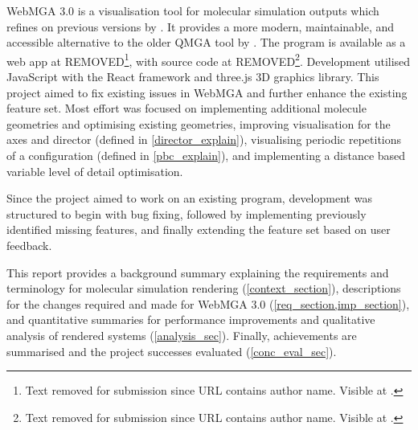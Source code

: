 WebMGA 3.0 is a visualisation tool for molecular simulation outputs which refines on previous versions by \textcite{Battistini_2021,webmga_2}. It provides a more modern, maintainable, and accessible alternative to the older QMGA tool by \textcite{gabriel2008molecular}. The program is available as a web app at REMOVED\footnote{Text removed for submission since URL contains author name. Visible at \cite{webmga_3_app}.}, with source code at REMOVED\footnote{Text removed for submission since URL contains author name. Visible at \cite{webmga_3_github}.}. Development utilised JavaScript with the React\cite{react} framework and three.js\cite{three} 3D graphics library. This project aimed to fix existing issues in WebMGA and further enhance the existing feature set. Most effort was focused on implementing additional molecule geometries and optimising existing geometries, improving visualisation for the axes and director (defined in \cref{director_explain}), visualising periodic repetitions of a configuration (defined in \cref{pbc_explain}), and implementing a distance based variable level of detail optimisation.

Since the project aimed to work on an existing program, development was structured to begin with bug fixing, followed by implementing previously identified missing features, and finally extending the feature set based on user feedback.

This report provides a background summary explaining the requirements and terminology for molecular simulation rendering (\cref{context_section}), descriptions for the changes required and made for WebMGA 3.0 (\cref{req_section,imp_section}), and quantitative summaries for performance improvements and qualitative analysis of rendered systems (\cref{analysis_sec}). Finally, achievements are summarised and the project successes evaluated (\cref{conc_eval_sec}).

